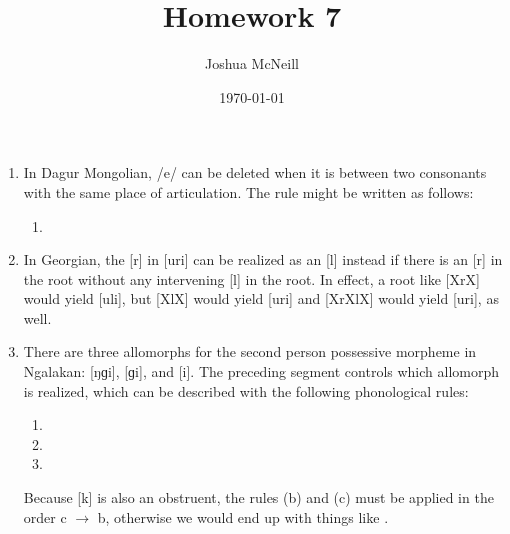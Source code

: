 \documentclass{article}
\author{Joshua McNeill}
\title{Homework 7}
\date{\today}
\begin{document}
  \maketitle
  \begin{enumerate}
    \item In Dagur Mongolian, /e/ can be deleted when it is between two consonants with the same place of articulation.
    The rule might be written as follows:
    \begin{enumerate}
      \item {}
    \end{enumerate}
    \item In Georgian, the [r] in [uri] can be realized as an [l] instead if there is an [r] in the root without any intervening [l] in the root.
    In effect, a root like [XrX] would yield [uli], but [XlX] would yield [uri] and [XrXlX] would yield [uri], as well.
    \item There are three allomorphs for the second person possessive morpheme in Ngalakan: [ŋɡi], [ɡi], and [i].
    The preceding segment controls which allomorph is realized, which can be described with the following phonological rules:
    \begin{enumerate}
      \item {}
      \item {}
      \item {}
    \end{enumerate}
    Because [k] is also an obstruent, the rules (b) and (c) must be applied in the order c $\rightarrow$ b, otherwise we would end up with things like \phon{[bak]}{[bakɡi]}.
  \end{enumerate}
\end{document}
